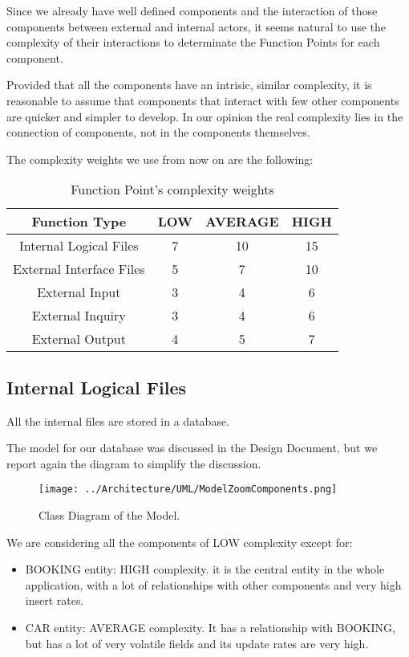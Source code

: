\documentclass[11pt]{article} %
\begin{document}
Since we already have well defined components and the interaction of those components between external and internal actors, it seems natural to use the complexity of their interactions to determinate the Function Points for each component.

Provided that all the components have an intrisic, similar complexity, it is reasonable to assume that components that interact with few other components are quicker and simpler to develop. In our opinion the real complexity lies in the connection of components, not in the components themselves.

The complexity weights we use from now on are the following:
\begin{table}[h]
\centering
\bgroup
\def\arraystretch{1.5}%
	\begin{tabular}{| c | c | c | c |}
	\hline
	Function Type & LOW & AVERAGE & HIGH \\
	\hline
	Internal Logical Files & 7 & 10 & 15 \\
	External Interface Files & 5 & 7 & 10 \\
	External Input & 3 & 4 & 6 \\
	External Inquiry & 3 & 4 & 6 \\
	External Output & 4 & 5 & 7 \\
	\hline
	\end{tabular}
\egroup
\caption{Function Point's complexity weights}
\end{table}


\subsection{Internal Logical Files}

All the internal files are stored in a database.

The model for our database was discussed in the Design Document, but we report again the diagram to simplify the discussion.

\begin{figure}[H]
	\centering
	\texttt{[image: ../Architecture/UML/ModelZoomComponents.png]}
	\caption{Class Diagram of the Model.}
\end{figure}	

We are considering all the components of LOW complexity except for:
\begin{itemize}[noitemsep]
	\item BOOKING entity: HIGH complexity. it is the central entity in the whole application, with a lot of relationships with other components and very high insert rates.
	\item CAR entity: AVERAGE complexity. It has a relationship with BOOKING, but has a lot of very volatile fields and its update rates are very high.
\end{itemize}
\end{document}
